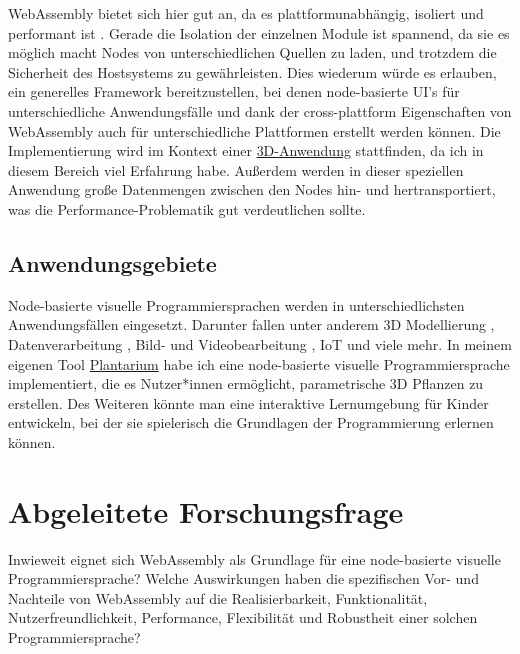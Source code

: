 \documentclass[ngerman]{article}
\begin{document}
\linebreak
\linebreak
WebAssembly bietet sich hier gut an, da es plattformunabhängig, isoliert und performant ist \cite{Haas2017}. Gerade die Isolation der einzelnen Module ist spannend, da sie es möglich macht Nodes von unterschiedlichen Quellen zu laden, und trotzdem die Sicherheit des Hostsystems zu gewährleisten.
\linebreak
\linebreak
Dies wiederum würde es erlauben, ein generelles Framework bereitzustellen, bei denen node-basierte UI's für unterschiedliche Anwendungsfälle und dank der cross-plattform Eigenschaften von WebAssembly auch für unterschiedliche Plattformen erstellt werden können.
\linebreak
\linebreak
Die Implementierung wird im Kontext einer \href{https://plant.max-richter.dev}{3D-Anwendung} stattfinden, da ich in diesem Bereich viel Erfahrung habe. Außerdem werden in dieser speziellen Anwendung große Datenmengen zwischen den Nodes hin- und hertransportiert, was die Performance-Problematik gut verdeutlichen sollte.

\subsection{Anwendungsgebiete}
Node-basierte visuelle Programmiersprachen werden in unterschiedlichsten Anwendungsfällen eingesetzt. Darunter fallen unter anderem 3D Modellierung \cite{houdini}, Datenverarbeitung \cite{rapidminer}, Bild- und Videobearbeitung \cite{davinci}, IoT \cite{nodered} und viele mehr. 
\linebreak
\linebreak
In meinem eigenen Tool \href{https://plant.max-richter.dev}{Plantarium} habe ich eine node-basierte visuelle Programmiersprache implementiert, die es Nutzer*innen ermöglicht, parametrische 3D Pflanzen zu erstellen. Des Weiteren könnte man eine interaktive Lernumgebung für Kinder entwickeln, bei der sie spielerisch die Grundlagen der Programmierung erlernen können.

\section{Abgeleitete Forschungsfrage}
Inwieweit eignet sich WebAssembly als Grundlage für eine node-basierte visuelle Programmiersprache?  
\linebreak
\linebreak
Welche Auswirkungen haben die spezifischen Vor- und Nachteile von WebAssembly auf die Realisierbarkeit, Funktionalität, Nutzerfreundlichkeit, Performance, Flexibilität und Robustheit einer solchen Programmiersprache?
\end{document}
